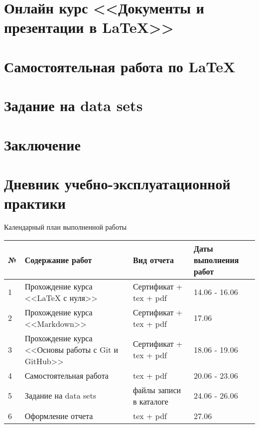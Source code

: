 \documentclass[a4paper,12pt]{article}
\begin{document}
	\section*{Онлайн курс <<Документы и презентации в \LaTeX>>}
	



	\newpage
	
	\section*{Самостоятельная работа по \LaTeX}




	\newpage
	
	\section*{Задание на data sets}
	


	\newpage

	\section*{Заключение}
	

	\newpage

	\section*{Дневник учебно-эксплуатационной практики}
	\begin{center}
		Календарный план выполненной работы
		\vspace{3ex}
	\end{center}
	
	\begin{tabular}{|l|l|l|l|}
		\hline
		№ & Содержание работ & Вид отчета & Даты выполнения работ \\ \hline
		1  & Прохождение курса <<LaTeX с нуля>> & Сертификат + tex + pdf & 14.06 - 16.06  \\ \hline
		2  & Прохождение курса <<Markdown>> & Сертификат + tex + pdf & 17.06  \\ \hline
		3  & Прохождение курса <<Основы работы с Git и GitHub>> & Сертификат + tex + pdf & 18.06 - 19.06  \\ \hline
		4  & Самостоятельная работа  & tex + pdf & 20.06 - 23.06  \\ \hline
		5  & Задание на data sets & файлы записи в каталоге & 24.06 - 26.06 \\ \hline
		6  & Оформление отчета & tex + pdf & 27.06 \\ \hline
	\end{tabular}
\end{document}
